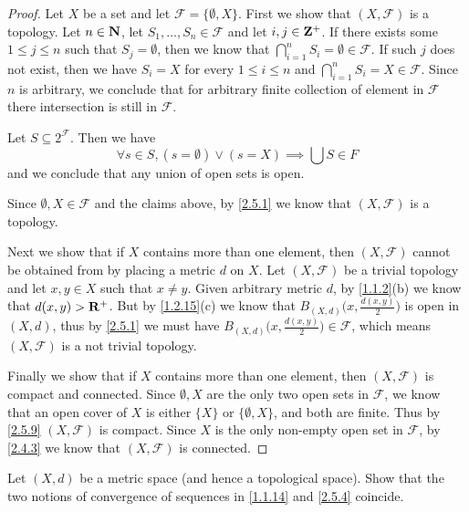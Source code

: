 \begin{proof}
  Let \(X\) be a set and let \(\mathcal{F} = \{\emptyset, X\}\).
  First we show that \((X, \mathcal{F})\) is a topology.
  Let \(n \in \mathbf{N}\), let \(S_1, \dots, S_n \in \mathcal{F}\) and let \(i, j \in \mathbf{Z}^+\).
  If there exists some \(1 \leq j \leq n\) such that \(S_j = \emptyset\), then we know that \(\bigcap_{i = 1}^n S_i = \emptyset \in \mathcal{F}\).
  If such \(j\) does not exist, then we have \(S_i = X\) for every \(1 \leq i \leq n\) and \(\bigcap_{i = 1}^n S_i = X \in \mathcal{F}\).
  Since \(n\) is arbitrary, we conclude that for arbitrary finite collection of element in \(\mathcal{F}\) there intersection is still in \(\mathcal{F}\).

  Let \(S \subseteq 2^{\mathcal{F}}\).
  Then we have
  \[
    \forall s \in S, (s = \emptyset) \lor (s = X) \implies \bigcup S \in F
  \]
  and we conclude that any union of open sets is open.

  Since \(\emptyset, X \in \mathcal{F}\) and the claims above, by \cref{2.5.1} we know that \((X, \mathcal{F})\) is a topology.

  Next we show that if \(X\) contains more than one element, then \((X, \mathcal{F})\) cannot be obtained from by placing a metric \(d\) on \(X\).
  Let \((X, \mathcal{F})\) be a trivial topology and let \(x, y \in X\) such that \(x \neq y\).
  Given arbitrary metric \(d\), by \cref{1.1.2}(b) we know that \(d(x, y) > \mathbf{R}^+\).
  But by \cref{1.2.15}(c) we know that \(B_{(X, d)}\big(x, \frac{d(x, y)}{2}\big)\) is open in \((X, d)\), thus by \cref{2.5.1} we must have \(B_{(X, d)}\big(x, \frac{d(x, y)}{2}\big) \in \mathcal{F}\), which means \((X, \mathcal{F})\) is a not trivial topology.

  Finally we show that if \(X\) contains more than one element, then \((X, \mathcal{F})\) is compact and connected.
  Since \(\emptyset, X\) are the only two open sets in \(\mathcal{F}\), we know that an open cover of \(X\) is either \(\{X\}\) or \(\{\emptyset, X\}\), and both are finite.
  Thus by \cref{2.5.9} \((X, \mathcal{F})\) is compact.
  Since \(X\) is the only non-empty open set in \(\mathcal{F}\), by \cref{2.4.3} we know that \((X, \mathcal{F})\) is connected.
\end{proof}

\begin{exercise}\label{ex 2.5.2}
  Let \((X, d)\) be a metric space
  (and hence a topological space).
  Show that the two notions of convergence of sequences in \cref{1.1.14} and \cref{2.5.4} coincide.
\end{exercise}

